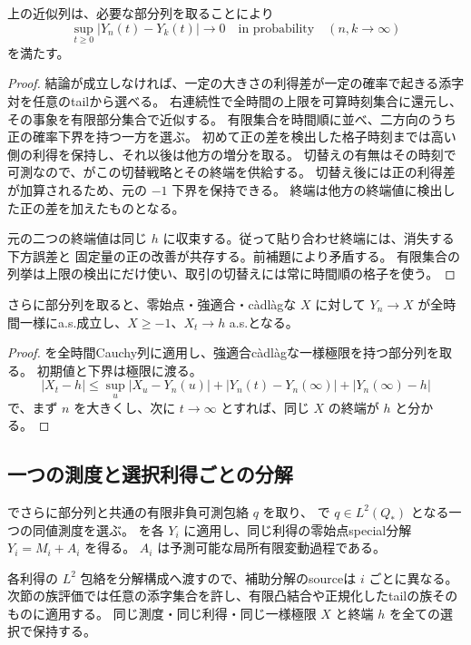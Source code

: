 \begin{proposition}[全時間のCauchy性]\label{prop:all-time-cauchy}
上の近似列は、必要な部分列を取ることにより
\[
 \sup_{t\geq0}|Y_n(t)-Y_k(t)|\longrightarrow0
 \quad\text{in probability}\quad(n,k\to\infty)
\]
を満たす。
\end{proposition}
\begin{proof}
結論が成立しなければ、一定の大きさの利得差が一定の確率で起きる添字対を任意のtailから選べる。
右連続性で全時間の上限を可算時刻集合に還元し、その事象を有限部分集合で近似する。
有限集合を時間順に並べ、二方向のうち正の確率下界を持つ一方を選ぶ。
初めて正の差を検出した格子時刻までは高い側の利得を保持し、それ以後は他方の増分を取る。
切替えの有無はその時刻で可測なので、がこの切替戦略とその終端を供給する。
切替え後には正の利得差が加算されるため、元の $-1$ 下界を保持できる。
終端は他方の終端値に検出した正の差を加えたものとなる。

元の二つの終端値は同じ $h$ に収束する。従って貼り合わせ終端には、消失する下方誤差と
固定量の正の改善が共存する。前補題により矛盾する。
有限集合の列挙は上限の検出にだけ使い、取引の切替えには常に時間順の格子を使う。
\end{proof}

\begin{proposition}[正則な一様極限とその終端]
さらに部分列を取ると、零始点・強適合・càdlàgな $X$ に対して
$Y_n\to X$ が全時間一様にa.s.成立し、$X\geq-1$、$X_t\to h$ a.s.となる。
\end{proposition}
\begin{proof}
を全時間Cauchy列に適用し、強適合càdlàgな一様極限を持つ部分列を取る。
初期値と下界は極限に渡る。
\[
 |X_t-h|\leq\sup_u|X_u-Y_n(u)|
       +|Y_n(t)-Y_n(\infty)|+|Y_n(\infty)-h|
\]
で、まず $n$ を大きくし、次に $t\to\infty$ とすれば、同じ $X$ の終端が $h$ と分かる。
\end{proof}

\subsection{一つの測度と選択利得ごとの分解}
でさらに部分列と共通の有限非負可測包絡 $q$ を取り、
で $q\in L^2(Q_*)$ となる一つの同値測度を選ぶ。
を各 $Y_i$ に適用し、同じ利得の零始点special分解 $Y_i=M_i+A_i$ を得る。
$A_i$ は予測可能な局所有限変動過程である。

各利得の $L^2$ 包絡を分解構成へ渡すので、補助分解のsourceは $i$ ごとに異なる。
次節の族評価では任意の添字集合を許し、有限凸結合や正規化したtailの族そのものに適用する。
同じ測度・同じ利得・同じ一様極限 $X$ と終端 $h$ を全ての選択で保持する。
